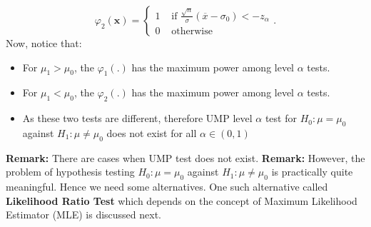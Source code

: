 \documentclass{article}
\begin{document}
\[
\varphi_2\left( \mathbf{x} \right)  = \begin{cases}
	1& \text{  if } \frac{\sqrt{n} }{\sigma}\left( \overline{x} - \sigma_0 \right) < -z_{\alpha}\\
	0 & \text{ otherwise }
\end{cases}
.\]
Now, notice that:
\begin{itemize}
	\item {For $\mu_1> \mu_0$, the $\varphi_1\left( . \right) $ has the maximum power among level $\alpha$ tests.}
	\item{For $\mu_1 < \mu_0$, the $\varphi_2\left( . \right) $ has the maximum power among level $\alpha$ tests.}
	\item{As these two tests are different, therefore UMP level $\alpha$ test for $H_0:\mu = \mu_0$ against $H_1:\mu\neq \mu_0$ does not exist for all $\alpha \in  \left( 0,1 \right) $}
\end{itemize}
\textbf{Remark:} There are cases when UMP test does not exist.
\newline\newline
\textbf{Remark:} However, the problem of hypothesis testing $H_0:\mu = \mu_0$ against $H_1:\mu\neq \mu_0$ is practically quite meaningful. Hence we need some alternatives. One such alternative called \textbf{Likelihood Ratio Test} which depends on the concept of Maximum Likelihood Estimator (MLE) is discussed next.
\end{document}
